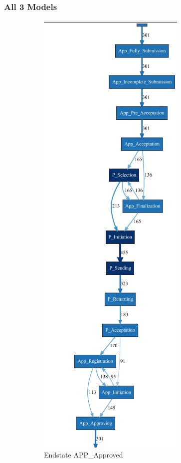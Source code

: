 \subsubsection{All 3 Models}
\begin{figure}[!htbp]
\centering
\begin{subfigure}{.3\textwidth}
\includegraphics[height=0.3\textheight]{APP_ApprovedDFG0-3.PNG}  
\caption{Endstate APP\_Approved}
\label{fig:ApprovModel}
\end{subfigure}
\begin{subfigure}{.3\textwidth}

\end{subfigure}
\end{figure}
